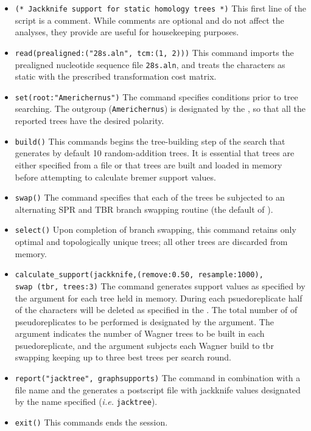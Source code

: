 \begin{itemize}
\item \texttt{(* Jackknife support for static homology trees *)} This first line of the script is a comment. While comments are optional and do not affect the analyses, they provide are useful for housekeeping purposes.
\item \texttt{read(prealigned:("28s.aln", tcm:(1, 2)))} This command imports the prealigned nucleotide sequence file \texttt{28s.aln}, and treats the characters as static with the prescribed transformation cost matrix.
\item \texttt{set(root:"Americhernus")} The  command specifies conditions prior to tree searching. The outgroup (\texttt{Americhernus}) is designated by the , so that all the reported trees have the desired polarity.     
\item \texttt{build()} This commands begins the tree-building step of the search that generates by default 10 random-addition trees. It is essential that trees are either specified from a file or that trees are built and loaded in memory before attempting to calculate bremer support values.
\item \texttt{swap()} The  command specifies that each of the trees be subjected to an alternating SPR and TBR branch swapping routine (the default of \poy).
\item \texttt{select()} Upon completion of branch swapping, this command retains only optimal and topologically unique trees; all other trees are discarded from memory. 
\item \texttt{calculate\_support(jackknife,(remove:0.50, resample:1000),\\swap (tbr, trees:3)} The  command generates support values as specified by the  argument for each tree held in memory. During each psuedoreplicate half of the characters will be deleted as specified in the .  The total number of of pseudoreplicates to be performed is designated by the  argument. The  argument indicates the number of Wagner trees to be built in each psuedoreplicate, and the  argument subjects each Wagner build to tbr swapping keeping up to three best trees per search round. 
\item \texttt{report("jacktree", graphsupports)}  The  command in combination with a file name and the  generates a postscript file with jackknife values designated by the name specified (\emph{i.e.} \texttt{jacktree}). 
\item \texttt{exit()} This commands ends the \poy session.
\end{itemize}

